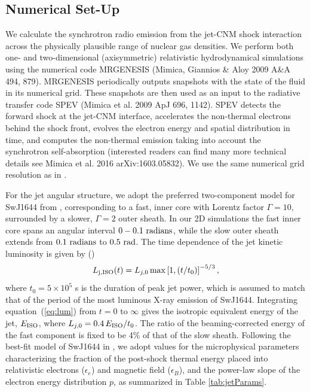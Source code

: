 \documentclass[usenatbib,fleqn]{mnras}
\begin{document}
\subsection{Numerical Set-Up}
\label{sec:numerical}
We calculate the synchrotron radio emission from the jet-CNM shock
interaction across the physically plausible range of nuclear gas
densities.  We perform both one- and two-dimensional (axisymmetric)
relativistic hydrodynamical simulations using the numerical code
MRGENESIS (Mimica, Giannios \& Aloy 2009 A\&A 494, 879). MRGENESIS
periodically outputs snapshots with the state of the fluid in its
numerical grid. These snapshots are then used as an input to the
radiative transfer code SPEV (Mimica et al. 2009 ApJ 696, 1142). SPEV
detects the forward shock at the jet-CNM interface, accelerates the
non-thermal electrons behind the shock front, evolves the electron
energy and spatial distribution in time, and computes the non-thermal
emission taking into account the synchrotron self-absorption
(interested readers can find many more technical details see Mimica et
al. 2016 arXiv:1603.05832). We use the same numerical grid resolution
as in \citet{Mimica+2015}.

For the jet angular structure, we adopt the preferred two-component
model for SwJ1644 from \citet{Mimica+2015}, corresponding to a fast,
inner core with Lorentz factor $\Gamma = 10$, surrounded by a slower,
$\Gamma=2$ outer sheath.  In our 2D simulations the fast inner core
spans an angular interval $0-0.1\ {\rm radians}$, while the slow outer
sheath extends from $0.1\ {\rm radians}$ to $0.5\ {\rm rad}$.  The
time dependence of the jet kinetic luminosity is given by
(\citealt{Mimica+2015})
\begin{equation}\label{eq:lum}
L_{\rm j, ISO}(t) = L_{j,0}\max\left[1, (t/t_0)\right]^{-5/3},
\end{equation}
where $t_0 = 5\times 10^5$ s is the duration of peak jet power, which
is assumed to match that of the period of the most luminous X-ray
emission of SwJ1644.  Integrating equation~(\ref{eq:lum}) from $t = 0$
to $\infty$ gives the isotropic equivalent energy of the jet, $E_{\rm
  ISO}$, where $L_{j,0}=0.4\, E_{\rm ISO}/t_0$.  The ratio of the
beaming-corrected energy of the fast component is fixed to be 4\% of
that of the slow sheath.  Following the best-fit model of SwJ1644 in
\citet{Mimica+2015}, we adopt values for the microphysical parameters
characterizing the fraction of the post-shock thermal energy placed
into relativistic electrons ($\epsilon_e$) and magnetic field
($\epsilon_B$), and the power-law slope of the electron energy
distribution $p$, as summarized in Table \ref{tab:jetParams}.
\end{document}
